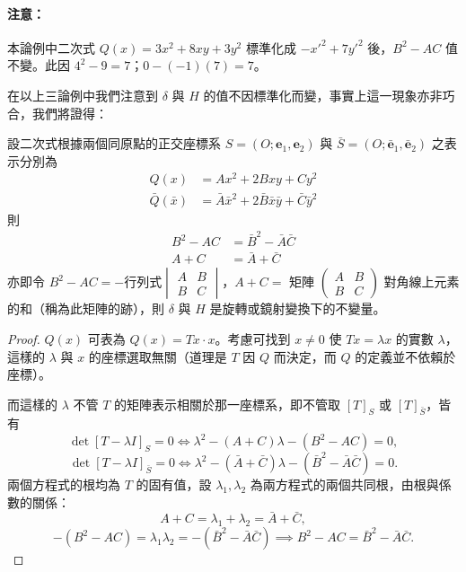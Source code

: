 \paragraph{注意：}
本論例中二次式 $Q(x) = 3x^2 + 8xy + 3y^2$ 標準化成 $-{x'}^2 + 7{y'}^2$ 後，$B^2 - AC$ 值不變。此因 $4^2 - 9 = 7$；$0 - (-1)(7) = 7$。

在以上三論例中我們注意到 $\delta$ 與 $H$ 的值不因標準化而變，事實上這一現象亦非巧合，我們將證得：

\begin{theorem}[不變量定理]
設二次式根據兩個同原點的正交座標系 $S = (O; \mathbf{e}_1, \mathbf{e}_2)$ 與 $\bar{S} = (O; \bar{\mathbf{e}}_1, \bar{\mathbf{e}}_2)$ 之表示分別為
\begin{align}
Q(x) &= Ax^2 + 2Bxy + Cy^2 \label{eq:b4-ch4-thm2-q1} \\
\bar{Q}(\bar{x}) &= \bar{A}\bar{x}^2 + 2\bar{B}\bar{x}\bar{y} + \bar{C}\bar{y}^2 \label{eq:b4-ch4-thm2-q2}
\end{align}
則
\begin{equation}
\begin{aligned}
B^2 - AC &= \bar{B}^2 - \bar{A}\bar{C} \\
A + C &= \bar{A} + \bar{C}
\end{aligned}
\label{eq:b4-ch4-thm2-invariants}
\end{equation}
亦即令 $B^2 - AC = -\text{行列式} \begin{vmatrix} A & B \\ B & C \end{vmatrix}$，$A + C =$ 矩陣 $\begin{pmatrix} A & B \\ B & C \end{pmatrix}$ 對角線上元素的和（稱為此矩陣的跡），則 $\delta$ 與 $H$ 是旋轉或鏡射變換下的不變量。
\end{theorem}

\begin{proof}
$Q(x)$ 可表為 $Q(x) = Tx \cdot x$。考慮可找到 $x \ne 0$ 使 $Tx = \lambda x$ 的實數 $\lambda$，這樣的 $\lambda$ 與 $x$ 的座標選取無關（道理是 $T$ 因 $Q$ 而決定，而 $Q$ 的定義並不依賴於座標）。

而這樣的 $\lambda$ 不管 $T$ 的矩陣表示相關於那一座標系，即不管取 $[T]_S$ 或 $[T]_{\bar{S}}$，皆有
\[
\det[T - \lambda I]_S = 0 \iff \lambda^2 - (A + C)\lambda - (B^2 - AC) = 0,
\]
\[
\det[T - \lambda I]_{\bar{S}} = 0 \iff \lambda^2 - (\bar{A} + \bar{C})\lambda - (\bar{B}^2 - \bar{A}\bar{C}) = 0.
\]
兩個方程式的根均為 $T$ 的固有值，設 $\lambda_1, \lambda_2$ 為兩方程式的兩個共同根，由根與係數的關係：
\[
A + C = \lambda_1 + \lambda_2 = \bar{A} + \bar{C},
\]
\[
-(B^2 - AC) = \lambda_1 \lambda_2 = -(\bar{B}^2 - \bar{A}\bar{C}) \implies B^2 - AC = \bar{B}^2 - \bar{A}\bar{C}.
\]
\end{proof}

